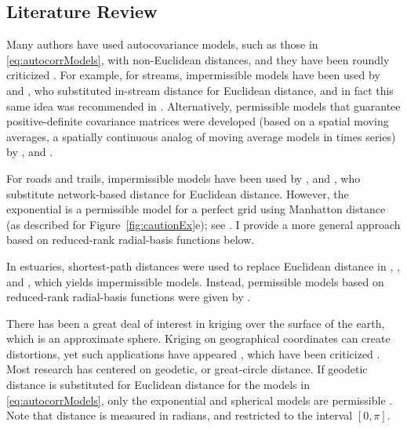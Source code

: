 \documentclass[11pt, titlepage]{article}\usepackage[]{graphicx}\usepackage[]{color}
\begin{document}
\begin{spacing}{1.9}
\begin{flushleft}
\subsection*{Literature Review}

Many authors have used autocovariance models, such as those in \ref{eq:autocorrModels}, with non-Euclidean distances, and they have been roundly criticized \citep{Curr:NonE:2006}.  For example, for streams, impermissible models have been used by \citet{Cres:Maju:spat:1997} and \citet{Gard:Sull:Lemb:pred:2003}, who substituted in-stream distance for Euclidean distance, and in fact this same idea was recommended in \citet{Okab:Sugi:spat:2012}. Alternatively, permissible models that guarantee positive-definite covariance matrices were developed (based on a spatial moving averages, a spatially continuous analog of moving average models in times series) by \citet{Ver:Pete:Theo:spat:2006}, \citet{Cres:Frey:Harc:Smit:spat:2006} and \citet{Ver:Pete:Move:2010}. 

For roads and trails, impermissible models have been used by \citet{Shio:Shio:stre:2011}, \citet{Selb:Kock:spat:2013} and \citet{Ladl:Avga:Whea:Boyc:pred:2016}, who substitute network-based distance for Euclidean distance.  However, the exponential is a permissible model for a perfect grid using Manhatton distance (as described for Figure~\ref{fig:cautionEx}e); see \citet{Curr:NonE:2006}. I provide a more general approach based on reduced-rank radial-basis functions below. 

In estuaries, shortest-path distances were used to replace Euclidean distance in \citet{Litt:Edwa:Port:krig:1997}, \citet{Rath:spat:1998}, and \citet{Jens:Chri:Mill:land:2006}, which yields impermissible models.  Instead, permissible models based on reduced-rank radial-basis functions were given by \citet{Wang:Rana:low:2007}.  

There has been a great deal of interest in kriging over the surface of the earth, which is an approximate sphere.  Kriging on geographical coordinates can create distortions, yet such applications have appeared \citep{Ecke:Gelf:baye:1997,Kalu:Vega:Card:Shel:anal:1998}, which have been criticized \citep{Bane:geod:2005}. Most research has centered on geodetic, or great-circle distance. If geodetic distance is substituted for Euclidean distance for the models in \ref{eq:autocorrModels}, only the exponential and spherical models are permissible \citep{Gnei:stri:2013}.  Note that distance is measured in radians, and restricted to the interval $[0,\pi]$.


\end{flushleft}
\end{spacing}
\end{document}
